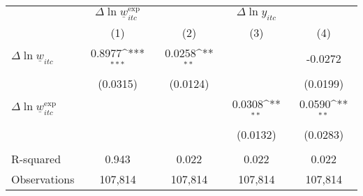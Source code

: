 {
\def\sym#1{\ifmmode^{#1}\else\(^{#1}\)\fi}
\begin{tabular}{l*{4}{c}}
\hline\hline
          &\multicolumn{1}{c}{$\Delta \ln \underline{w}_{itc}^{\text{exp}}$}&\multicolumn{3}{c}{$\Delta \ln y_{itc}$}                \\\cmidrule(lr){2-2}\cmidrule(lr){3-5}
          &\multicolumn{1}{c}{(1)}         &\multicolumn{1}{c}{(2)}         &\multicolumn{1}{c}{(3)}         &\multicolumn{1}{c}{(4)}         \\
\hline
$\Delta \ln \underline{w}_{itc}$&   0.8977\sym{***}&   0.0258\sym{**} &                  &  -0.0272         \\
          & (0.0315)         & (0.0124)         &                  & (0.0199)         \\
[1em]
$\Delta \ln \underline{w}_{itc}^{\text{exp}}$&                  &                  &   0.0308\sym{**} &   0.0590\sym{**} \\
          &                  &                  & (0.0132)         & (0.0283)         \\
\hline
\vspace{-2mm}&                  &                  &                  &                  \\
R-squared &    0.943         &    0.022         &    0.022         &    0.022         \\
Observations&  107,814         &  107,814         &  107,814         &  107,814         \\
\hline\hline
\end{tabular}
}
